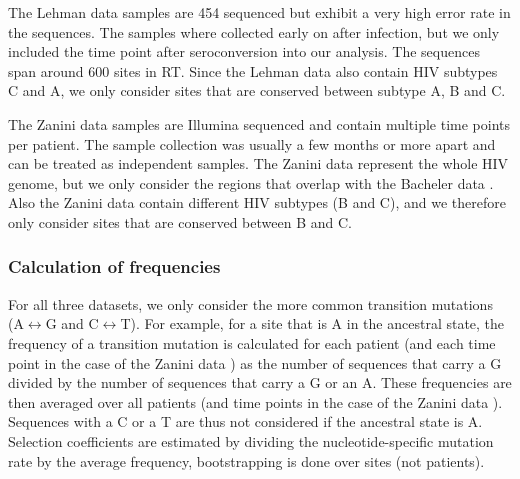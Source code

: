 \documentclass{article}
\begin{document}
The Lehman data samples are 454 sequenced but exhibit a very high error rate in the sequences. The samples where collected early on after infection, but we only included the time point after seroconversion into our analysis. The sequences span around 600 sites in RT. Since the Lehman data \cite{lehman2015risk} also contain HIV subtypes C and A, we only consider sites that are conserved between subtype A, B and C. 

The Zanini data \cite{zanini2016population} samples are Illumina sequenced and contain multiple time points per patient. The sample collection was usually a few months or more apart and can be treated as independent samples. The Zanini data represent the whole HIV genome, but we only consider the regions that overlap with the Bacheler data \cite{bacheler2000human}.
Also the Zanini data \cite{zanini2016population} contain different HIV subtypes (B and C),  and we therefore only consider sites that are conserved between B and C. 

\subsubsection*{Calculation of frequencies}
For all three datasets, we only consider the more common transition mutations (A$\leftrightarrow$G and C$\leftrightarrow$T). For example, for a site that is A in the ancestral state, the frequency of a transition mutation is calculated for each patient (and each time point in the case of the Zanini data \cite{zanini2016population}) as the number of sequences that carry a G divided by the number of sequences that carry a G or an A. These frequencies are then averaged over all patients (and time points in the case of the Zanini data \cite{zanini2016population}).
Sequences with a C or a T are thus not considered if the ancestral state is A. Selection coefficients are estimated by dividing the nucleotide-specific mutation rate by the average frequency, bootstrapping is done over sites (not patients). 
\end{document}
